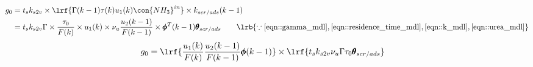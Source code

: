 \begin{align*}
        g_0 &= t_s k_{s2v} \times \lrf{\Gamma(k-1) \tau(k) u_1(k) \con{NH_3}^{in}} \times k_{scr/ads}(k-1)\\
                &= t_s k_{s2v} \Gamma \times \frac{\tau_0}{F(k)} \times u_1 (k) \times \nu_u \frac{u_2(k-1)}{F(k-1)}\times \pmb \phi^T(k-1) \pmb \theta_{scr/ads}
                \qquad \lrb{\because \ref{eqn::gamma_mdl}, \ref{eqn::residence_time_mdl}, \ref{eqn::k_mdl}, \ref{eqn::urea_mdl}}
\end{align*}
\begin{align}
        g_0 &= \lrf{ \frac{u_1(k)}{F(k)} \frac{u_2(k-1)}{F(k-1)} \pmb \phi(k-1) } \times \lrf{ t_s k_{s2v} \nu_u \Gamma \tau_0 \pmb \theta_{scr/ads} }
\end{align}
